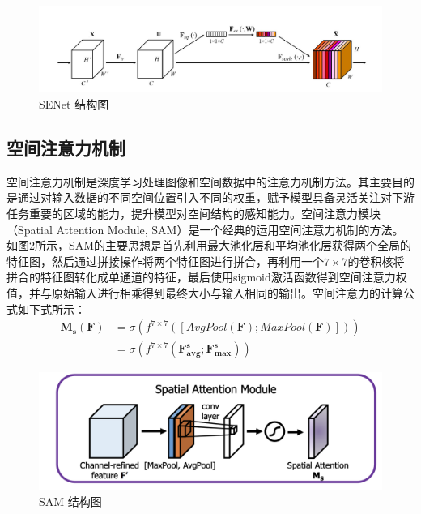 \begin{figure}[h]
  \centering
  \includegraphics[width=14cm]{pic/chapter3/SENet.jpg}
  \caption{SENet 结构图}
  \label{SENet}
\end{figure}

\subsection{空间注意力机制}
空间注意力机制是深度学习处理图像和空间数据中的注意力机制方法。其主要目的是通过对输入数据的不同空间位置引入不同的权重，赋予模型具备灵活关注对下游任务重要的区域的能力，提升模型对空间结构的感知能力。空间注意力模块（Spatial Attention Module, SAM）是一个经典的运用空间注意力机制的方法。如图\ref{SAM}所示，SAM的主要思想是首先利用最大池化层和平均池化层获得两个全局的特征图，然后通过拼接操作将两个特征图进行拼合，再利用一个$7\times 7$的卷积核将拼合的特征图转化成单通道的特征，最后使用sigmoid激活函数得到空间注意力权值，并与原始输入进行相乘得到最终大小与输入相同的输出。空间注意力的计算公式如下式所示：
\begin{equation}
  \begin{aligned}
    \mathbf{M}_{\mathbf{s}}\left( \mathbf{F} \right) & =\sigma \left( f^{7\times 7}\left( \left[ AvgPool\left( \mathbf{F} \right) ;MaxPool\left( \mathbf{F} \right) \right] \right) \right)
    \\
                                                     & =\sigma \left( f^{7\times 7}\left( \mathbf{F}_{\mathbf{avg}}^{\mathbf{s}};\mathbf{F}_{\mathbf{max}}^{\mathbf{s}} \right) \right)
  \end{aligned}
\end{equation}

\begin{figure}[h]
  \centering
  \includegraphics[width=14cm]{pic/chapter3/SAM.png}
  \caption{SAM 结构图}
  \label{SAM}
\end{figure}
